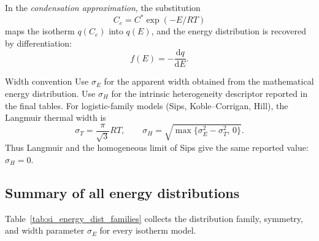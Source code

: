 \documentclass[journal=jacsat,manuscript=article]{achemso}
\begin{document}
In the \emph{condensation approximation}, the substitution
\begin{equation}
	C_e = C^{\ast}\exp(-E/RT)
	\label{eq:si_condensation}
\end{equation}
maps the isotherm $q(C_e)$ into $q(E)$, and the energy distribution
is recovered by differentiation:
\begin{equation}
	f(E) = -\frac{\mathrm{d}q}{\mathrm{d}E}.
	\label{eq:si_fE_derivative}
\end{equation}

\begin{bluebox}{Width convention}
	Use \(\sigma_E\) for the apparent width obtained from the mathematical
	energy distribution. Use \(\sigma_H\) for the intrinsic heterogeneity
	descriptor reported in the final tables. For logistic-family models
	(Sips, Koble--Corrigan, Hill), the Langmuir thermal width is
	\[
		\sigma_T=\frac{\pi}{\sqrt{3}}RT,
		\qquad
		\sigma_H=\sqrt{\max\{\sigma_E^2-\sigma_T^2,\,0\}}.
	\]
	Thus Langmuir and the homogeneous limit of Sips give the same
	reported value: \(\sigma_H=0\).
\end{bluebox}

\subsection{Summary of all energy distributions}
\label{sec:si_dist_summary}

Table~\ref{tab:si_energy_dist_families} collects the distribution
family, symmetry, and width parameter $\sigma_E$ for every isotherm
model.
\end{document}
